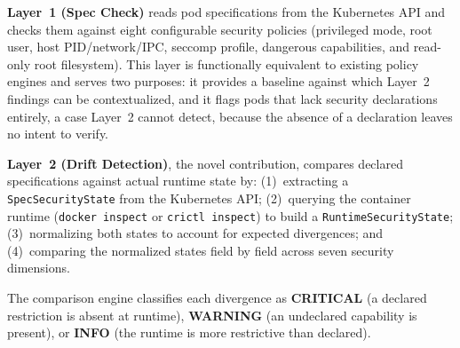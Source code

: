 \documentclass[sigconf]{acmart}
\begin{document}
\textbf{Layer~1 (Spec Check)} reads pod specifications from the Kubernetes API and checks them against eight configurable security policies (privileged mode, root user, host PID/network/IPC, seccomp profile, dangerous capabilities, and read-only root filesystem). This layer is functionally equivalent to existing policy engines and serves two purposes: it provides a baseline against which Layer~2 findings can be contextualized, and it flags pods that lack security declarations entirely, a case Layer~2 cannot detect, because the absence of a declaration leaves no intent to verify.

\textbf{Layer~2 (Drift Detection)}, the novel contribution, compares declared specifications against actual runtime state by: (1)~extracting a \texttt{SpecSecurityState} from the Kubernetes API; (2)~querying the container runtime (\texttt{docker inspect} or \texttt{crictl inspect}) to build a \texttt{RuntimeSecurityState}; (3)~normalizing both states to account for expected divergences; and (4)~comparing the normalized states field by field across seven security dimensions.

The comparison engine classifies each divergence as \textbf{CRITICAL} (a declared restriction is absent at runtime), \textbf{WARNING} (an undeclared capability is present), or \textbf{INFO} (the runtime is more restrictive than declared).
\end{document}
